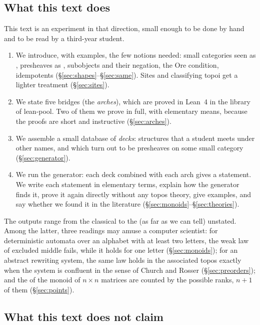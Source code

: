 \subsection{What this text does}

This text is an experiment in that direction, small enough to be done by hand and to be read by a third-year student.

\begin{enumerate}
\item We introduce, with examples, the few notions needed: small categories seen as , presheaves as , subobjects and their negation, the Ore condition, idempotents (\S\ref{sec:shapes}--\S\ref{sec:same}). Sites and classifying topoi get a lighter treatment (\S\ref{sec:sites}).
\item We state five bridges (the \emph{arches}), which are proved in Lean~4 in the library \lp{} of lean-pool. Two of them we prove in full, with elementary means, because the proofs are short and instructive (\S\ref{sec:arches}).
\item We assemble a small database of \emph{decks}: structures that a student meets under other names, and which turn out to be presheaves on some small category (\S\ref{sec:generator}).
\item We run the generator: each deck combined with each arch gives a statement. We write each statement in elementary terms, explain how the generator finds it, prove it again directly without any topos theory, give examples, and say whether we found it in the literature (\S\ref{sec:monoids}--\S\ref{sec:theories}).
\end{enumerate}

The outputs range from the classical to the (as far as we can tell) unstated. Among the latter, three readings may amuse a computer scientist: for deterministic automata over an alphabet with at least two letters, the weak law of excluded middle fails, while it holds for one letter (\S\ref{sec:monoids}); for an abstract rewriting system, the same law holds in the associated topos exactly when the system is confluent in the sense of Church and Rosser (\S\ref{sec:preorders}); and the  of the monoid of $n\times n$ matrices are counted by the possible ranks, $n+1$ of them (\S\ref{sec:points}).

\subsection{What this text does not claim}


